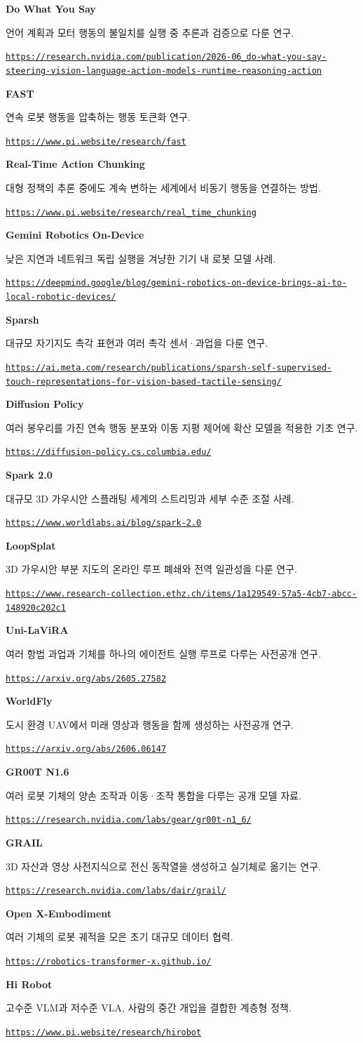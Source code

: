 \documentclass[11pt,openany]{book}
\newcommand{\sourceitem}[3]{%
  \par\smallskip\noindent
  {\sffamily\bfseries\color{deepblue}#1}\par
  {\footnotesize #2\par\href{#3}{\nolinkurl{#3}}}\par
}
\begin{document}
\sourceitem{Do What You Say}
{언어 계획과 모터 행동의 불일치를 실행 중 추론과 검증으로 다룬 연구.}
{https://research.nvidia.com/publication/2026-06_do-what-you-say-steering-vision-language-action-models-runtime-reasoning-action}

\sourceitem{FAST}
{연속 로봇 행동을 압축하는 행동 토큰화 연구.}
{https://www.pi.website/research/fast}

\sourceitem{Real-Time Action Chunking}
{대형 정책의 추론 중에도 계속 변하는 세계에서 비동기 행동을 연결하는 방법.}
{https://www.pi.website/research/real_time_chunking}

\sourceitem{Gemini Robotics On-Device}
{낮은 지연과 네트워크 독립 실행을 겨냥한 기기 내 로봇 모델 사례.}
{https://deepmind.google/blog/gemini-robotics-on-device-brings-ai-to-local-robotic-devices/}

\sourceitem{Sparsh}
{대규모 자기지도 촉각 표현과 여러 촉각 센서·과업을 다룬 연구.}
{https://ai.meta.com/research/publications/sparsh-self-supervised-touch-representations-for-vision-based-tactile-sensing/}

\sourceitem{Diffusion Policy}
{여러 봉우리를 가진 연속 행동 분포와 이동 지평 제어에 확산 모델을 적용한 기초 연구.}
{https://diffusion-policy.cs.columbia.edu/}

\sourceitem{Spark 2.0}
{대규모 3D 가우시안 스플래팅 세계의 스트리밍과 세부 수준 조절 사례.}
{https://www.worldlabs.ai/blog/spark-2.0}

\sourceitem{LoopSplat}
{3D 가우시안 부분 지도의 온라인 루프 폐쇄와 전역 일관성을 다룬 연구.}
{https://www.research-collection.ethz.ch/items/1a129549-57a5-4cb7-abcc-148920c202c1}

\sourceitem{Uni-LaViRA}
{여러 항법 과업과 기체를 하나의 에이전트 실행 루프로 다루는 사전공개 연구.}
{https://arxiv.org/abs/2605.27582}

\sourceitem{WorldFly}
{도시 환경 UAV에서 미래 영상과 행동을 함께 생성하는 사전공개 연구.}
{https://arxiv.org/abs/2606.06147}

\sourceitem{GR00T N1.6}
{여러 로봇 기체의 양손 조작과 이동·조작 통합을 다루는 공개 모델 자료.}
{https://research.nvidia.com/labs/gear/gr00t-n1_6/}

\sourceitem{GRAIL}
{3D 자산과 영상 사전지식으로 전신 동작열을 생성하고 실기체로 옮기는 연구.}
{https://research.nvidia.com/labs/dair/grail/}

\sourceitem{Open X-Embodiment}
{여러 기체의 로봇 궤적을 모은 초기 대규모 데이터 협력.}
{https://robotics-transformer-x.github.io/}

\sourceitem{Hi Robot}
{고수준 VLM과 저수준 VLA, 사람의 중간 개입을 결합한 계층형 정책.}
{https://www.pi.website/research/hirobot}
\end{document}
